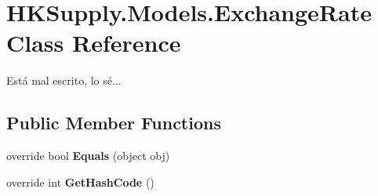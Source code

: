 \hypertarget{class_h_k_supply_1_1_models_1_1_exchange_rate}{}\section{H\+K\+Supply.\+Models.\+Exchange\+Rate Class Reference}
\label{class_h_k_supply_1_1_models_1_1_exchange_rate}


Está mal escrito, lo sé...  


\subsection*{Public Member Functions}
\begin{DoxyCompactItemize}
\item 
\mbox{\label{class_h_k_supply_1_1_models_1_1_exchange_rate_a747d3d081ffcc9fd4f5cfe68f694dc1d}} 
override bool {\bfseries Equals} (object obj)
\item 
\mbox{\label{class_h_k_supply_1_1_models_1_1_exchange_rate_a4d6cde27199225c167b1dd644806fa4e}} 
override int {\bfseries Get\+Hash\+Code} ()
\end{DoxyCompactItemize}
